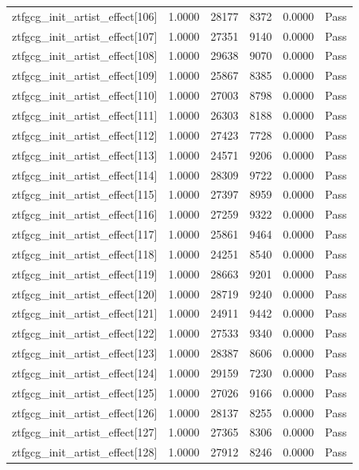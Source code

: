 \begin{table}[htbp]
\begin{tabular}{llrrll}
ztfgcg\_init\_artist\_effect[106] & 1.0000 & 28177 & 8372 & 0.0000 & Pass \\
ztfgcg\_init\_artist\_effect[107] & 1.0000 & 27351 & 9140 & 0.0000 & Pass \\
ztfgcg\_init\_artist\_effect[108] & 1.0000 & 29638 & 9070 & 0.0000 & Pass \\
ztfgcg\_init\_artist\_effect[109] & 1.0000 & 25867 & 8385 & 0.0000 & Pass \\
ztfgcg\_init\_artist\_effect[110] & 1.0000 & 27003 & 8798 & 0.0000 & Pass \\
ztfgcg\_init\_artist\_effect[111] & 1.0000 & 26303 & 8188 & 0.0000 & Pass \\
ztfgcg\_init\_artist\_effect[112] & 1.0000 & 27423 & 7728 & 0.0000 & Pass \\
ztfgcg\_init\_artist\_effect[113] & 1.0000 & 24571 & 9206 & 0.0000 & Pass \\
ztfgcg\_init\_artist\_effect[114] & 1.0000 & 28309 & 9722 & 0.0000 & Pass \\
ztfgcg\_init\_artist\_effect[115] & 1.0000 & 27397 & 8959 & 0.0000 & Pass \\
ztfgcg\_init\_artist\_effect[116] & 1.0000 & 27259 & 9322 & 0.0000 & Pass \\
ztfgcg\_init\_artist\_effect[117] & 1.0000 & 25861 & 9464 & 0.0000 & Pass \\
ztfgcg\_init\_artist\_effect[118] & 1.0000 & 24251 & 8540 & 0.0000 & Pass \\
ztfgcg\_init\_artist\_effect[119] & 1.0000 & 28663 & 9201 & 0.0000 & Pass \\
ztfgcg\_init\_artist\_effect[120] & 1.0000 & 28719 & 9240 & 0.0000 & Pass \\
ztfgcg\_init\_artist\_effect[121] & 1.0000 & 24911 & 9442 & 0.0000 & Pass \\
ztfgcg\_init\_artist\_effect[122] & 1.0000 & 27533 & 9340 & 0.0000 & Pass \\
ztfgcg\_init\_artist\_effect[123] & 1.0000 & 28387 & 8606 & 0.0000 & Pass \\
ztfgcg\_init\_artist\_effect[124] & 1.0000 & 29159 & 7230 & 0.0000 & Pass \\
ztfgcg\_init\_artist\_effect[125] & 1.0000 & 27026 & 9166 & 0.0000 & Pass \\
ztfgcg\_init\_artist\_effect[126] & 1.0000 & 28137 & 8255 & 0.0000 & Pass \\
ztfgcg\_init\_artist\_effect[127] & 1.0000 & 27365 & 8306 & 0.0000 & Pass \\
ztfgcg\_init\_artist\_effect[128] & 1.0000 & 27912 & 8246 & 0.0000 & Pass \\

\end{tabular}
\end{table}
